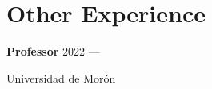 \section{Other Experience}
\newcommand{\pos}[4]{%
	\parbox[t][][t]{\linewidth}{%
		\parbox{\linewidth}{\textbf{#1} \hfill {{#3} --- {#4}}}
		\parbox{\linewidth}{{#2}}
	}
\bigbreak
\smallskip
}


\pos{Professor}{Universidad de Morón}{2022}{}


%
%
%



